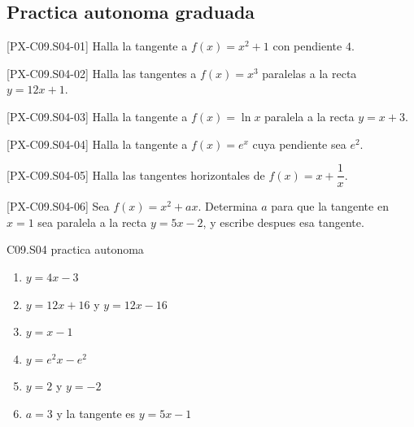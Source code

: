 \subsection*{Practica autonoma graduada}
\begin{exercise}{[PX-C09.S04-01] Halla la tangente a \(f(x)=x^2+1\) con pendiente \(4\).}
\end{exercise}
\begin{exercise}{[PX-C09.S04-02] Halla las tangentes a \(f(x)=x^3\) paralelas a la recta \(y=12x+1\).}
\end{exercise}
\begin{exercise}{[PX-C09.S04-03] Halla la tangente a \(f(x)=\ln x\) paralela a la recta \(y=x+3\).}
\end{exercise}
\begin{exercise}{[PX-C09.S04-04] Halla la tangente a \(f(x)=e^x\) cuya pendiente sea \(e^2\).}
\end{exercise}
\begin{exercise}{[PX-C09.S04-05] Halla las tangentes horizontales de \(f(x)=x+\dfrac{1}{x}\).}
\end{exercise}
\begin{exercise}{[PX-C09.S04-06] Sea \(f(x)=x^2+ax\). Determina \(a\) para que la tangente en
\(x=1\) sea paralela a la recta \(y=5x-2\), y escribe despues esa tangente.}
\end{exercise}

\begin{shortanswer}{C09.S04 practica autonoma}
\begin{enumerate}[label=\textbf{PX-C09.S04-\arabic*:}, leftmargin=*]
  \item \(y=4x-3\)
  \item \(y=12x+16\) y \(y=12x-16\)
  \item \(y=x-1\)
  \item \(y=e^2x-e^2\)
  \item \(y=2\) y \(y=-2\)
  \item \(a=3\) y la tangente es \(y=5x-1\)
\end{enumerate}
\end{shortanswer}

